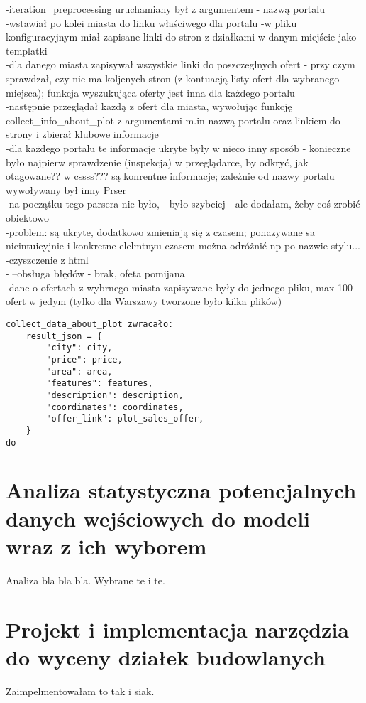 \documentclass[a4paper,12pt,twoside,openany]{report}
\begin{document}
-iteration\_preprocessing uruchamiany był z argumentem - nazwą portalu\\
-wstawiał po kolei miasta do linku właściwego dla portalu -w pliku konfiguracyjnym miał zapisane linki do stron z działkami w danym miejście jako templatki\\
-dla danego miasta zapisywał wszystkie linki do poszczeglnych ofert - przy czym sprawdzał, czy nie ma koljenych stron (z kontuacją listy ofert dla wybranego miejsca); funkcja wyszukująca oferty jest inna dla każdego portalu\\
-następnie przeglądał kazdą z ofert dla miasta, wywołując funkcję collect\_info\_about\_plot z argumentami m.in nazwą portalu oraz linkiem do strony i zbierał klubowe informacje\\
-dla każdego portalu te informacje ukryte były w nieco inny sposób - konieczne było najpierw sprawdzenie (inspekcja) w przeglądarce, by odkryć, jak otagowane?? w cssss??? są konrentne informacje; zależnie od nazwy portalu wywoływany był inny Prser\\
-na początku tego parsera nie było, - było szybciej - ale dodałam, żeby coś zrobić obiektowo \\
-problem: są ukryte, dodatkowo zmieniają się z czasem; ponazywane sa nieintuicyjnie i konkretne elelmtnyu czasem można odróżnić np po nazwie stylu...\\
-czyszczenie z html\\
-
--obsługa błędów - brak, ofeta pomijana\\
-dane o ofertach z wybrnego miasta zapisywane były do jednego pliku, max 100 ofert w jedym (tylko dla Warszawy tworzone było kilka plików)

\begin{verbatim}
collect_data_about_plot zwracało:
    result_json = {
        "city": city,
        "price": price,
        "area": area,
        "features": features,
        "description": description,
        "coordinates": coordinates,
        "offer_link": plot_sales_offer,
    }
do 
\end{verbatim}



\chapter{Analiza statystyczna potencjalnych danych wejściowych do modeli wraz z ich wyborem}
Analiza bla bla bla.
Wybrane te i te.
\chapter{Projekt i implementacja narzędzia do wyceny działek budowlanych}
Zaimpelmentowałam to tak i siak.
\end{document}
